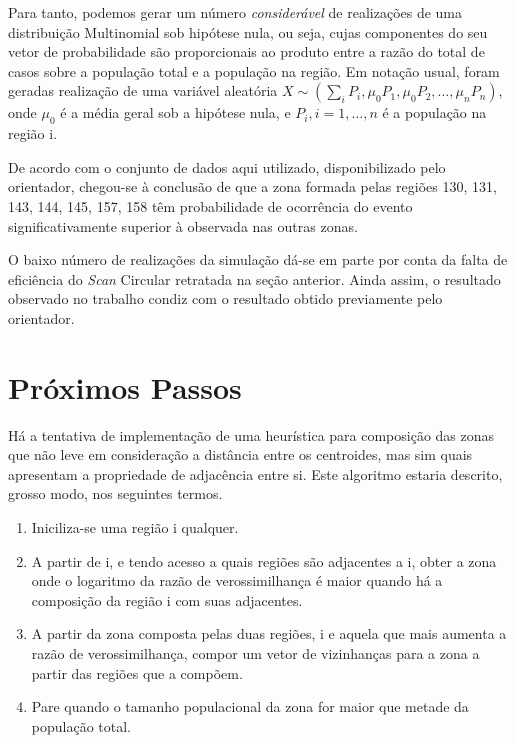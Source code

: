 \documentclass[
	12pt,				%
	openright,			%
	twoside,			%
	a4paper,			%
	english,			%
	french,				%
	spanish,			%
	brazil,				%
	]{abntex2}
\begin{document}
Para tanto, podemos gerar um número \textit{considerável} de realizações de uma distribuição Multinomial sob hipótese nula, ou seja, cujas componentes do seu vetor de probabilidade são proporcionais ao produto entre a razão do total de casos sobre a população total e a população na região. Em notação usual, foram geradas realização de uma variável aleatória $X \sim (\sum_i P_i, \mu_0 P_1, \mu_0 P_2, \dots, \mu_n P_n)$, onde $\mu_0$ é a média geral sob a hipótese nula, e $P_i, i=1,\dots, n$ é a população na região i.

De acordo com o conjunto de dados aqui utilizado, disponibilizado pelo orientador, chegou-se à conclusão de que a zona formada pelas regiões 130, 131, 143, 144, 145, 157, 158 têm probabilidade de ocorrência do evento significativamente superior à observada nas outras zonas. 

O baixo número de realizações da simulação dá-se em parte por conta da falta de eficiência do \textit{Scan} Circular retratada na seção anterior. Ainda assim, o resultado observado no trabalho condiz com o resultado obtido previamente pelo orientador.



\chapter{Próximos Passos}
\label{chap:posterior}

Há a tentativa de implementação de uma heurística para composição das zonas que não leve em consideração a distância entre os centroides, mas sim quais apresentam a propriedade de adjacência entre si. Este algoritmo estaria descrito, grosso modo, nos seguintes termos.

\begin{enumerate}
\item Iniciliza-se uma região i qualquer.
\item A partir de i, e tendo acesso a quais regiões são adjacentes a i, obter a zona onde o logaritmo da razão de verossimilhança é maior quando há a composição da região i com suas adjacentes.
\item A partir da zona composta pelas duas regiões, i e aquela que mais aumenta a razão de verossimilhança, compor um vetor de vizinhanças para a zona a partir das regiões que a compõem.
\item Pare quando o tamanho populacional da zona for maior que metade da população total.
\end{enumerate}
\end{document}
